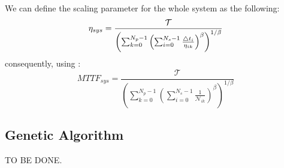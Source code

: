 We can define the scaling parameter for the whole system as the following:
\[
  \eta_{sys} = \frac{\mathcal{T}}{\left(\sum_{k=0}^{N_p - 1} \left(\sum_{i=0}^{N_s - 1}\frac{\triangle t_i}{\eta_{ik}}\right)^{\beta} \right)^{1/\beta}} \\
\]
consequently, using :
\[
  MTTF_{sys} = \frac{\mathcal{T}}{\left(\sum_{k=0}^{N_p - 1} \left(\sum_{i=0}^{N_s - 1}\frac{1}{\mathcal{N}_{ik}}\right)^{\beta} \right)^{1/\beta}}
\]

\subsection{Genetic Algorithm}
TO BE DONE.
